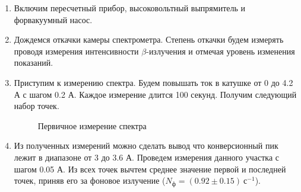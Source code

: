 \documentclass[14pt, a4paper]{report}
\begin{document}
\begin{enumerate}

\item Включим пересчетный прибор, высоковольтный выпрямитель и форвакуумный насос.

\item Дождемся откачки камеры спектрометра. Степень откачки будем измерять проводя измерения интенсивности $\beta$-излучения и отмечая уровень изменения показаний.

\item Приступим к измерению спектра. Будем повышать ток в катушке от 0 до 4.2 А с шагом 0.2 А. Каждое измерение длится 100 секунд. Получим следующий набор точек.

\begin{figure}[H]
\centering
{}
\caption{Первичное измерение спектра}
\end{figure}

\item Из полученных измерений можно сделать вывод что конверсионный пик лежит в диапазоне от 3 до 3.6 А. Проведем измерения данного участка с шагом 0.05 А. Из всех точек вычтем среднее значение первой и последней точек, приняв его за фоновое излучение ($N_{ф}=(0.92\pm0.15)\ с^{-1}$).


\end{enumerate}
\end{document}
